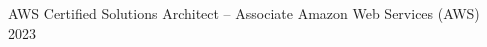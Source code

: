 

\begin{cvhonors}

  \cvhonor
    {AWS Certified Solutions Architect – Associate} %
    {Amazon Web Services (AWS)} %
    {} %
    {2023} %

\end{cvhonors}